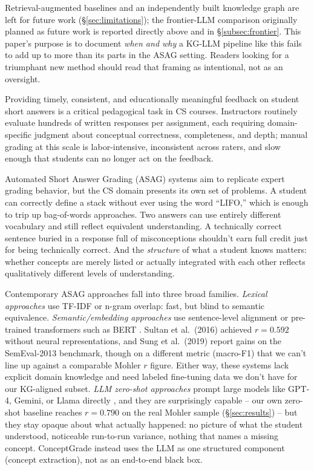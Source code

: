 \documentclass[conference]{IEEEtran}
\begin{document}
Retrieval-augmented baselines and an independently built knowledge
graph are left for future work (\S\ref{sec:limitations}); the
frontier-LLM comparison originally planned as future work is reported
directly above and in \S\ref{subsec:frontier}. This paper's purpose is to document
\emph{when and why} a KG-LLM pipeline like this fails to add up to more
than its parts in the ASAG setting. Readers looking for a triumphant new
method should read that framing as intentional, not as an oversight.


Providing timely, consistent, and educationally meaningful feedback on
student short answers is a critical pedagogical task in CS courses.
Instructors routinely evaluate hundreds of written responses per
assignment, each requiring domain-specific judgment about conceptual
correctness, completeness, and depth; manual grading at this scale is
labor-intensive, inconsistent across raters, and slow enough that
students can no longer act on the feedback.

Automated Short Answer Grading (ASAG) systems aim to replicate expert
grading behavior, but the CS domain presents its own set of problems.
A student can correctly define a stack without ever using the word
``LIFO,'' which is enough to trip up bag-of-words approaches. Two
answers can use entirely different vocabulary and still reflect
equivalent understanding. A technically correct sentence buried in a
response full of misconceptions shouldn't earn full credit just for
being technically correct. And the \emph{structure} of what a student
knows matters: whether concepts are merely listed or actually
integrated with each other reflects qualitatively different levels of
understanding.

Contemporary ASAG approaches fall into three broad families.
\emph{Lexical approaches} \cite{mohler2009} use TF-IDF or n-gram
overlap: fast, but blind to semantic equivalence.
\emph{Semantic/embedding approaches} \cite{sultan2016,bert_asag} use
sentence-level alignment or pre-trained transformers such as BERT
\cite{devlin2019}. Sultan et al.\ (2016) achieved $r=0.592$ without
neural representations, and Sung et al.\ (2019) \cite{bert_asag}
report gains on the SemEval-2013 benchmark, though on a different
metric (macro-F1) that we can't line up against a comparable Mohler
$r$ figure. Either way, these systems lack explicit domain knowledge
and need labeled fine-tuning data we don't have for our KG-aligned
subset. \emph{LLM zero-shot approaches} prompt large models like
GPT-4, Gemini, or Llama directly \cite{llm_asag1,llm_asag2}, and they
are surprisingly capable -- our own zero-shot baseline reaches
$r=0.790$ on the real Mohler sample (\S\ref{sec:results}) -- but they
stay opaque about what actually happened: no picture of what the
student understood, noticeable run-to-run variance, nothing that
names a missing concept. ConceptGrade instead uses the LLM as one
structured component (concept extraction), not as an end-to-end black
box.
\end{document}
